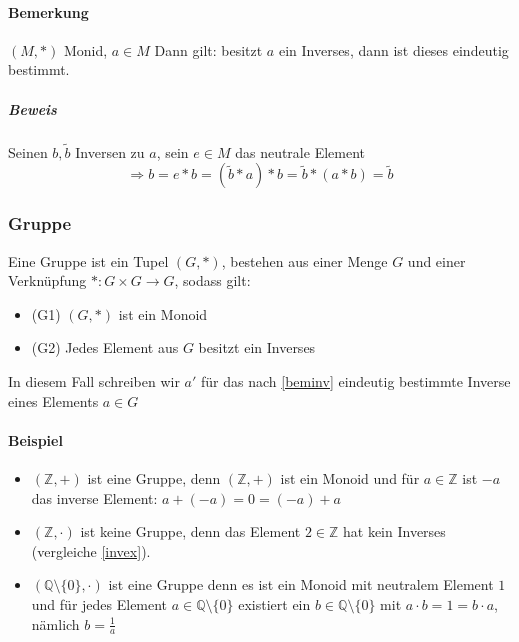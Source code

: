 \documentclass[a4paper]{scrartcl}
\theoremstyle{definition}
\theoremstyle{plain}
\theoremstyle{plain}
\theoremstyle{remark}
\theoremstyle{remark}
\theoremstyle{remark}
\begin{document}
\paragraph{Bemerkung}
\label{sec-3-1-3-2}
\label{beminv}
$(M,*)$ Monid, $a\in M$ Dann gilt: besitzt $a$ ein Inverses, dann ist dieses eindeutig bestimmt.
\subparagraph{Beweis}
\label{sec-3-1-3-2-1}
Seinen $b,\tilde b$ Inversen zu $a$, sein $e\in M$ das neutrale Element
\[\Rightarrow b = e * b = (\tilde b * a) * b = \tilde b * (a * b) = \tilde b\]
\subsubsection{Gruppe}
\label{sec-3-1-4}
Eine Gruppe ist ein Tupel $(G,*)$, bestehen aus einer Menge $G$ und einer Verknüpfung $*:G\times G \to G$, sodass gilt:
\begin{itemize}
\item (G1) $(G,*)$ ist ein Monoid
\item (G2) Jedes Element aus $G$ besitzt ein Inverses
\end{itemize}
In diesem Fall schreiben wir $a'$ für das nach \ref{beminv} eindeutig bestimmte Inverse eines Elements $a\in G$
\paragraph{Beispiel}
\label{sec-3-1-4-1}
\begin{itemize}
\item $(\mathbb{Z},+)$ ist eine Gruppe, denn $(\mathbb{Z},+)$ ist ein Monoid und für $a\in\mathbb{Z}$ ist $-a$ das inverse Element: $a + (-a) = 0 = (-a) + a$
\item $(\mathbb{Z},\cdot)$ ist keine Gruppe, denn das Element $2\in\mathbb{Z}$ hat kein Inverses (vergleiche \ref{invex}).
\item $(\mathbb{Q}\setminus \{0\},\cdot)$ ist eine Gruppe denn es ist ein Monoid mit neutralem Element $1$ und für jedes Element $a\in\mathbb{Q}\setminus\{0\}$ existiert ein $b\in \mathbb{Q}\setminus \{0\}$ mit $a\cdot b = 1 = b\cdot a$, nämlich $b = \frac{1}{a}$
\end{itemize}
\end{document}
